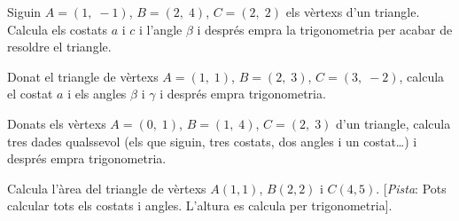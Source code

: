 \begin{activitats}
\begin{mylist}
	 \exer  Siguin $A=\left(1,\; -1\right)$, $B=\left(2,\; 4\right)$, $C=\left(2,\; 2\right)$ els vèrtexs d'un triangle. Calcula els costats $a$  i $c$ i l'angle $\beta$ i després empra la trigonometria per acabar de resoldre el triangle.
	 
	  
	 \exer  Donat el triangle de vèrtexs $A=\left(1,\; 1\right)$, $B=\left(2,\; 3\right)$, $C=\left(3,\; -2\right)$, calcula el costat $a$ i els angles $\beta $ i $\gamma$ i després empra trigonometria.
	 
	  
	 \exer   Donats els vèrtexs $A=\left(0,\; 1\right)$, $B=\left(1,\; 4\right)$, $C=\left(2,\; 3\right)$ d'un triangle, calcula tres dades qualssevol (els que siguin, tres costats, dos angles i un costat{\dots}) i després empra trigonometria.
	 
	  
	 \exer  Calcula l'àrea del triangle de vèrtexs $A(1,1)$, $B(2,2)$ i $C(4,5)$. [\textit{Pista}: Pots calcular tots els costats i angles. L'altura es calcula per trigonometria].
	  

\end{mylist}
\end{activitats}
